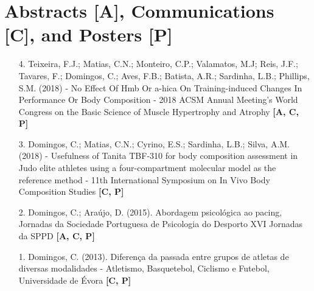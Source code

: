 \section*{Abstracts [A], Communications [C], and Posters [P]}

\begin{enumerate}

  \item[4.] Teixeira, F.J.; Matias, C.N.; Monteiro, C.P.; Valamatos, M.J; Reis, J.F.; Tavares, F.; Domingos, C.; Aves, F.B.; Batista, A.R.; Sardinha, L.B.; Phillips, S.M. (2018) - No Effect Of Hmb Or a-hica On Training-induced Changes In Performance Or Body Composition - 2018 ACSM Annual Meeting's World Congress on the Basic Science of Muscle Hypertrophy and Atrophy \textbf{[A, C, P]} 

  \item[3.] Domingos, C.; Matias, C.N.; Cyrino, E.S.; Sardinha, L.B.; Silva, A.M. (2018) - Usefulness of Tanita TBF-310 for body composition assessment in Judo elite athletes using a four-compartment molecular model as the reference method - 11th International Symposium on In Vivo Body Composition Studies \textbf{[C, P]} 

  \item[2.] Domingos, C.; Araújo, D. (2015). Abordagem psicológica ao pacing, Jornadas da Sociedade Portuguesa de Psicologia do Desporto XVI Jornadas da SPPD \textbf{[A, C, P]}

  \item[1.] Domingos, C. (2013). Diferença da passada entre grupos de atletas de diversas modalidades - Atletismo, Basquetebol, Ciclismo e Futebol, Universidade de Évora \textbf{[C, P]}
  
\end{enumerate}
